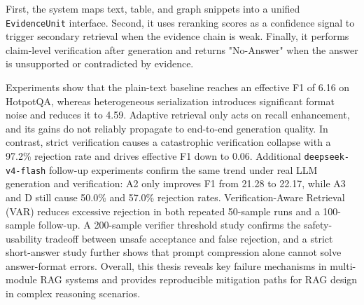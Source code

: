 First, the system maps text, table, and graph snippets into a unified \texttt{EvidenceUnit} interface. Second, it uses reranking scores as a confidence signal to trigger secondary retrieval when the evidence chain is weak. Finally, it performs claim-level verification after generation and returns "No-Answer" when the answer is unsupported or contradicted by evidence.

Experiments show that the plain-text baseline reaches an effective F1 of 6.16 on HotpotQA, whereas heterogeneous serialization introduces significant format noise and reduces it to 4.59. Adaptive retrieval only acts on recall enhancement, and its gains do not reliably propagate to end-to-end generation quality. In contrast, strict verification causes a catastrophic verification collapse with a 97.2\% rejection rate and drives effective F1 down to 0.06. Additional \texttt{deepseek-v4-flash} follow-up experiments confirm the same trend under real LLM generation and verification: A2 only improves F1 from 21.28 to 22.17, while A3 and D still cause 50.0\% and 57.0\% rejection rates. Verification-Aware Retrieval (VAR) reduces excessive rejection in both repeated 50-sample runs and a 100-sample follow-up. A 200-sample verifier threshold study confirms the safety-usability tradeoff between unsafe acceptance and false rejection, and a strict short-answer study further shows that prompt compression alone cannot solve answer-format errors. Overall, this thesis reveals key failure mechanisms in multi-module RAG systems and provides reproducible mitigation paths for RAG design in complex reasoning scenarios.
